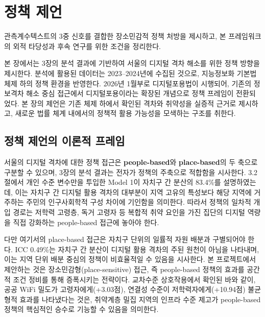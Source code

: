 \section{정책 제언}
\label{sec:policy}


\begin{quoteblock}
관측\textperiodcentered{}계수\textperiodcentered{}텍스트의 3중 신호를 결합한 장소민감적 정책 처방을 제시하고, 본 프레임워크의 외적 타당성과 후속 연구를 위한 조건을 정리한다.
\end{quoteblock}


본 장에서는 3장의 분석 결과에 기반하여 서울의 디지털 격차 해소를 위한 정책 방향을 제시한다. 분석에 활용된 데이터는 2023--2024년에 수집된 것으로, 지능정보화 기본법 체제 하의 정책 환경을 반영한다. 2026년 1월부로 디지털포용법이 시행되어, 기존의 정보격차 해소 중심 접근에서 디지털포용이라는 확장된 개념으로 정책 프레임이 전환되었다. 본 장의 제언은 기존 체제 하에서 확인된 격차와 취약성을 실증적 근거로 제시하고, 새로운 법률 체계 내에서의 정책적 활용 가능성을 모색하는 구조를 취한다.

\subsection{정책 제언의 이론적 프레임}
\label{subsec:4-1}

서울의 디지털 격차에 대한 정책 접근은 \textbf{people-based}와 \textbf{place-based}의 두 축으로 구분할 수 있으며, 3장의 분석 결과는 전자가 정책의 주축으로 적합함을 시사한다. 3.2절에서 개인 수준 변수만을 투입한 Model 1이 자치구 간 분산의 83.4\%를 설명하였는데, 이는 자치구 간 디지털 활용 격차의 대부분이 지역 고유의 특성보다 해당 지역에 거주하는 주민의 인구사회학적 구성 차이에 기인함을 의미한다. 따라서 정책의 일차적 개입 경로는 저학력 고령층, 독거 고령자 등 복합적 취약 요인을 가진 집단의 디지털 역량을 직접 강화하는 people-based 접근에 놓아야 한다.

다만 여기서의 place-based 접근은 자치구 단위의 일률적 자원 배분과 구별되어야 한다. ICC 0.49\%는 자치구 간 분산이 디지털 활용 격차의 주된 원천이 아님을 나타내며, 이는 지역 단위 배분 중심의 정책이 비효율적일 수 있음을 시사한다. 본 프로젝트에서 제안하는 것은 장소민감형(place-sensitive) 접근, 즉 people-based 정책의 효과를 공간적 조건 정비를 통해 증폭시키는 전략이다. 교차수준 상호작용에서 확인된 바와 같이, 공공 WiFi 밀도가 고령자에게(+3.03점), 연결성 수준이 저학력자에게(+10.94점) 불균형적 효과를 나타냈다는 것은, 취약계층 밀집 지역의 인프라 수준 제고가 people-based 정책의 핵심적인 승수로 기능할 수 있음을 의미한다.

